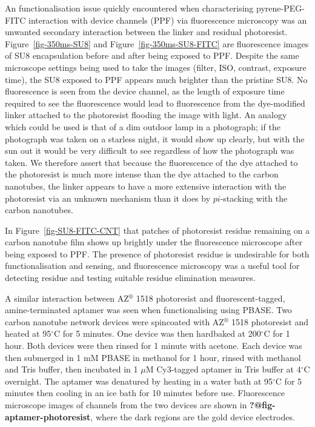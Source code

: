\documentclass[
  a4paper,
]{scrbook}
\begin{document}
An functionalisation issue quickly encountered when characterising
pyrene-PEG-FITC interaction with device channels (PPF) via fluorescence
microscopy was an unwanted secondary interaction between the linker and
residual photoresist. Figure~\ref{fig-350ms-SU8} and
Figure~\ref{fig-350ms-SU8-FITC} are fluorescence images of SU8
encapsulation before and after being exposed to PPF. Despite the same
microscope settings being used to take the images (filter, ISO,
contrast, exposure time), the SU8 exposed to PPF appears much brighter
than the pristine SU8. No fluorescence is seen from the device channel,
as the length of exposure time required to see the fluorescence would
lead to fluorescence from the dye-modified linker attached to the
photoresist flooding the image with light. An analogy which could be
used is that of a dim outdoor lamp in a photograph; if the photograph
was taken on a starless night, it would show up clearly, but with the
sun out it would be very difficult to see regardless of how the
photograph was taken. We therefore assert that because the fluorescence
of the dye attached to the photoresist is much more intense than the dye
attached to the carbon nanotubes, the linker appears to have a more
extensive interaction with the photoresist via an unknown mechanism than
it does by \(pi\)-stacking with the carbon nanotubes.

In Figure~\ref{fig-SU8-FITC-CNT} that patches of photoresist residue
remaining on a carbon nanotube film shows up brightly under the
fluorescence microscope after being exposed to PPF. The presence of
photoresist residue is undesirable for both functionalisation and
sensing, and fluorescence microscopy was a useful tool for detecting
residue and testing suitable residue elimination measures.

A similar interaction between AZ\(^\circledR\) 1518 photoresist and
fluorescent-tagged, amine-terminated aptamer was seen when
functionalising using PBASE. Two carbon nanotube network devices were
spincoated with AZ\(^\circledR\) 1518 photoresist and heated at
95\(^\circ\)C for 5 minutes. One device was then hardbaked at
200\(^\circ\)C for 1 hour. Both devices were then rinsed for 1 minute
with acetone. Each device was then submerged in 1 mM PBASE in methanol
for 1 hour, rinsed with methanol and Tris buffer, then incubated in 1
\(\mu\)M Cy3-tagged aptamer in Tris buffer at 4\(^\circ\)C overnight.
The aptamer was denatured by heating in a water bath at 95\(^\circ\)C
for 5 minutes then cooling in an ice bath for 10 minutes before use.
Fluorescence microscope images of channels from the two devices are
shown in \textbf{?@fig-aptamer-photoresist}, where the dark regions are
the gold device electrodes.
\end{document}

